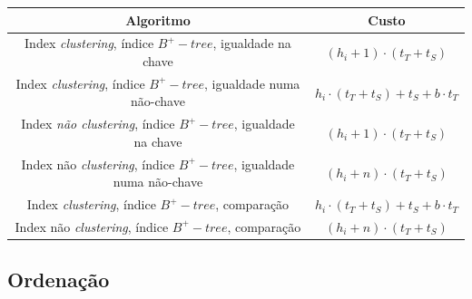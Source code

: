 \documentclass[oneside]{book}
\theoremstyle{definition}
\begin{document}
\begin{table}[H]
    \centering
    \begin{tabular}{c|c}
       Algoritmo                              & Custo  \\ \hline
      Index \textit{clustering}, índice $B^{+}-tree$, igualdade na chave                        &  $(h_i + 1) \cdot (t_T + t_S)$     \\ \hline
      Index \textit{clustering}, índice $B^{+}-tree$, igualdade numa não-chave                        &  $h_i \cdot (t_T + t_S) + t_S + b \cdot t_T$  \\ \hline
      Index \textit{não clustering}, índice $B^{+}-tree$, igualdade na chave                        &  $(h_i + 1) \cdot (t_T + t_S)$     \\ \hline
      Index não \textit{clustering}, índice $B^{+}-tree$, igualdade numa não-chave                        &   $(h_i + n) \cdot (t_T + t_S)$  \\ \hline
      Index \textit{clustering}, índice $B^{+}-tree$, comparação                        & $h_i \cdot (t_T + t_S) + t_S + b \cdot t_T$     \\ \hline
      Index não \textit{clustering}, índice $B^{+}-tree$, comparação                        &    $(h_i + n) \cdot (t_T + t_S)$  \\ \hline
    \end{tabular}
\end{table}

\subsection{Ordenação}
\end{document}
